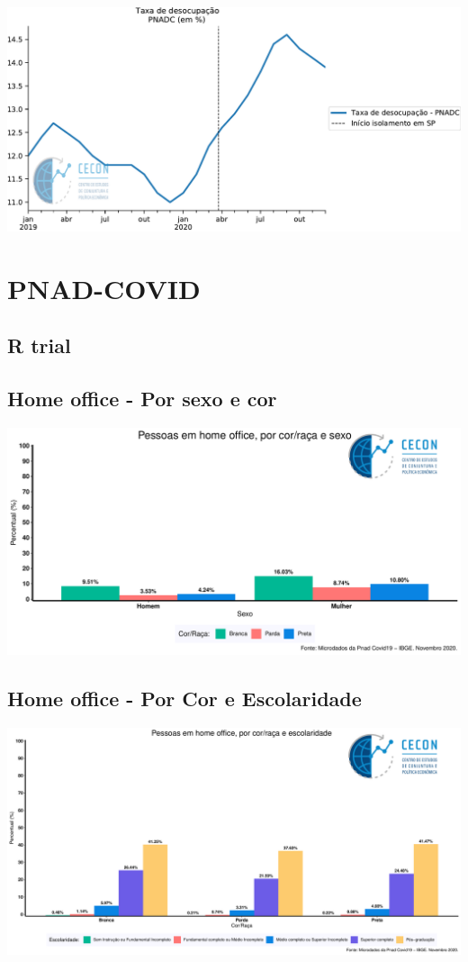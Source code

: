 \documentclass{SelfArx}
\begin{document}
\begin{center}
\includegraphics[width=.9\linewidth]{./figs/Emprego/TaxaDesocupacao.pdf}
\end{center}

\section*{PNAD-COVID}
\label{sec:orgeb923ab}
\subsection*{R trial}
\label{sec:org93712b8}
\subsection*{Home office - Por sexo e cor}
\label{sec:org668d07c}




\begin{center}
\includegraphics[width=.9\linewidth]{./figs/PNAD_COVID/home_sexo_cor.pdf}
\end{center}

\subsection*{Home office - Por Cor e Escolaridade}
\label{sec:org1ef4578}
\begin{center}
\includegraphics[width=.9\linewidth]{./figs/PNAD_COVID/home_edu_cor.pdf}
\end{center}
\end{document}
